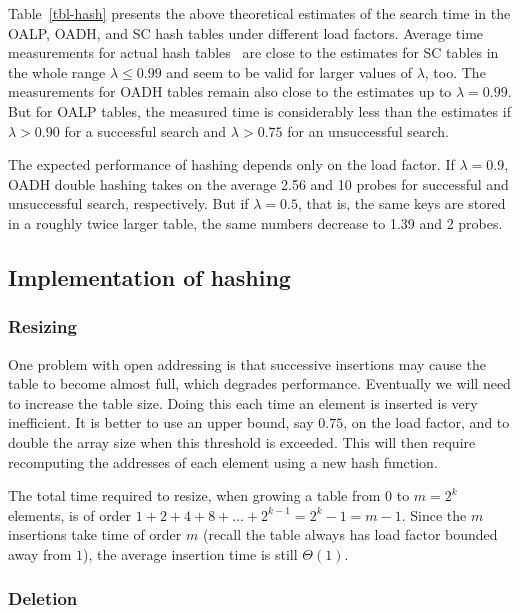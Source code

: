 Table~\ref{tbl-hash} presents the above theoretical 
estimates of the search time in the OALP, OADH, and SC hash tables under 
different load factors. Average time measurements for actual hash
tables~\cite{standish} are close to the estimates for SC tables in  the whole
range \(\lambda \le 0.99\) and seem to be valid for larger
values of \(\lambda\), too. The measurements for OADH tables
remain also close to the estimates up to  \(\lambda = 0.99\).
But for OALP tables, the measured time is considerably
less than the estimates if \( \lambda > 0.90\) for a successful search and 
\( \lambda > 0.75\) for an unsuccessful search.

\begin{Example}
The expected performance of hashing depends only on the load factor.
If \(\lambda = 0.9\), OADH 
double hashing takes on the average 2.56 and 10 probes for 
successful and unsuccessful search, respectively. But 
if \(\lambda = 0.5\), that is, the same keys are stored 
in a roughly twice larger table, the same numbers decrease
to 1.39 and 2 probes.
\end{Example}


\subsection{Implementation of hashing}

\subsubsection{Resizing} 
One problem with open addressing is that successive insertions may cause the table
to become almost full, which degrades performance. Eventually we will need to 
increase the table size. Doing this each time an element is inserted is very 
inefficient. It is better to use an upper bound, say $0.75$, on the load factor, 
and to double the array size when this threshold is exceeded. This will then require 
recomputing the addresses of each element using a new hash function.

The total time required to resize, when growing a table from $0$ to $m=2^k$ elements,
is of order $1 + 2 + 4 + 8 + \dots + 2^{k-1} = 2^k - 1 = m - 1$. Since the $m$ 
insertions take time of order $m$ (recall the table always has load factor 
bounded away from $1$), the average insertion time is still $\Theta(1)$.

\subsubsection{Deletion}

